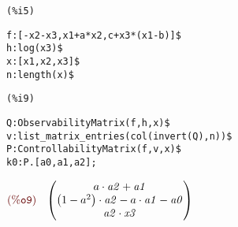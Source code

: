 \noindent
\begin{minipage}[t]{8ex}\color{red}\bf
\begin{verbatim}
(%i5) 
\end{verbatim}
\end{minipage}
\begin{minipage}[t]{\textwidth}\color{blue}
\begin{verbatim}
f:[-x2-x3,x1+a*x2,c+x3*(x1-b)]$
h:log(x3)$
x:[x1,x2,x3]$
n:length(x)$
\end{verbatim}
\end{minipage}

\smallskip

\noindent
\begin{minipage}[t]{8ex}\color{red}\bf
\begin{verbatim}
(%i9) 
\end{verbatim}
\end{minipage}
\begin{minipage}[t]{\textwidth}\color{blue}
\begin{verbatim}
Q:ObservabilityMatrix(f,h,x)$
v:list_matrix_entries(col(invert(Q),n))$
P:ControllabilityMatrix(f,v,x)$
k0:P.[a0,a1,a2];
\end{verbatim}
\end{minipage}

\noindent
$\displaystyle
\parbox{8ex}{$\color{labelcolor}\mathrm{\tt (\%o9) }\quad $}
\begin{pmatrix}a\cdot \mathit{a2}+\mathit{a1}\cr \left( 1-{{a}^{2}}\right) \cdot \mathit{a2}-a\cdot \mathit{a1}-\mathit{a0}\cr \mathit{a2}\cdot \mathit{x3}\end{pmatrix}\mbox{}
$
